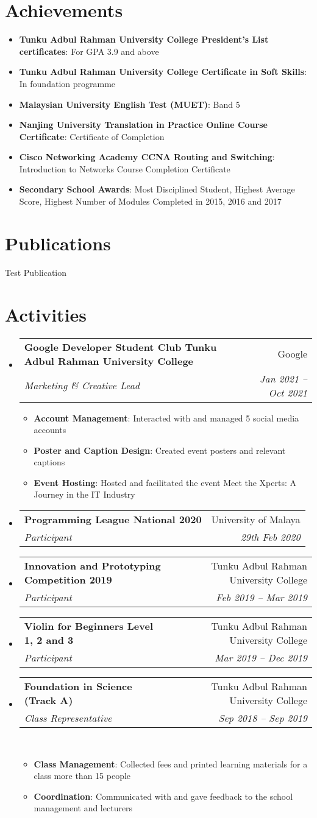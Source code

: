 \documentclass[a4paper,11pt]{article}
\makeatletter
\newcommand{\resumeItem}[2]{
  \item\small{
    \textbf{#1}{: #2 \vspace{-2pt}}
  }
}
\newcommand{\resumeSubheading}[4]{
  \vspace{-1pt}\item
    \begin{tabular*}{0.97\textwidth}[t]{l@{\extracolsep{\fill}}r}
      \textbf{#1} & #2 \\
      \textit{\small#3} & \textit{\small #4} \\
    \end{tabular*}\vspace{-5pt}
}
\newcommand{\resumeSubItem}[2]{\resumeItem{#1}{#2}\vspace{-4pt}}
\newcommand{\resumeSubHeadingListStart}{\begin{itemize}[leftmargin=*]}
\newcommand{\resumeSubHeadingListEnd}{\end{itemize}}
\newcommand{\resumeItemListStart}{\begin{itemize}}
\newcommand{\resumeItemListEnd}{\end{itemize}\vspace{-5pt}}
\makeatother
\begin{document}
\section{Achievements}
\resumeSubHeadingListStart
\resumeSubItem{Tunku Adbul Rahman University College President's List certificates}{For GPA 3.9 and above}
\resumeSubItem{Tunku Adbul Rahman University College Certificate in Soft Skills}{In foundation programme}
\resumeSubItem{Malaysian University English Test (MUET)}{Band 5}
\resumeSubItem{Nanjing University Translation in Practice Online Course Certificate}{Certificate of Completion}
\resumeSubItem{Cisco Networking Academy CCNA Routing and Switching}{Introduction to Networks Course Completion Certificate}
\resumeSubItem{Secondary School Awards}{Most Disciplined Student, Highest Average Score, Highest Number of Modules Completed in 2015, 2016 and 2017}
\resumeSubHeadingListEnd


\section{Publications}
Test Publication


\section{Activities}
\resumeSubHeadingListStart
\resumeSubheading{Google Developer Student Club Tunku Adbul Rahman University College}{Google}
{Marketing \& Creative Lead}{Jan 2021 -- Oct 2021}
\resumeItemListStart
\resumeItem{Account Management}{Interacted with and managed 5 social media accounts}
\resumeItem{Poster and Caption Design}{Created event posters and relevant captions}
\resumeItem{Event Hosting}{Hosted and facilitated the event Meet the Xperts: A Journey in the IT Industry}
\resumeItemListEnd

\resumeSubheading{Programming League National 2020}{University of Malaya}
{Participant}{29th Feb 2020}

\resumeSubheading{Innovation and Prototyping Competition 2019}{Tunku Adbul Rahman University College}{Participant}{Feb 2019 -- Mar 2019}

\resumeSubheading{Violin for Beginners Level 1, 2 and 3}{Tunku Adbul Rahman University College}{Participant}{Mar 2019 -- Dec 2019}

\resumeSubheading{Foundation in Science (Track A)}{Tunku Adbul Rahman University College}{Class Representative}{Sep 2018 -- Sep 2019}\
\resumeItemListStart
\resumeItem{Class Management}{Collected fees and printed learning materials for a class more than 15 people}
\resumeItem{Coordination}{Communicated with and gave feedback to the school management and lecturers}
\resumeItemListEnd
\resumeSubHeadingListEnd
\end{document}
